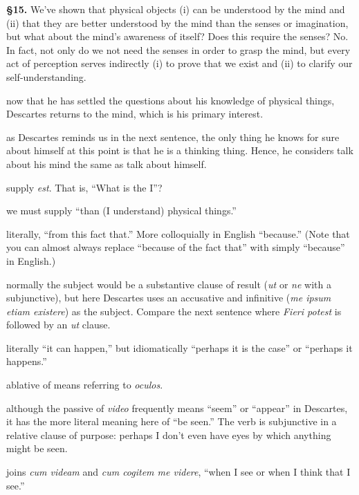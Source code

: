 \prenotes

\textbf{§15.} We've shown that physical objects (i) can be understood by the mind and (ii) that they are better understood by the mind than the senses or imagination, but what about the mind's awareness of itself? Does this require the senses? No. In fact, not only do we not need the senses in order to grasp the mind, but every act of perception serves indirectly (i) to prove that we exist and (ii) to clarify our self-understanding.

 now that he has settled the questions about his knowledge of physical things, Descartes returns to the mind, which is his primary interest.

 as Descartes reminds us in the next sentence, the only thing he knows for sure about himself at this point is that he is a thinking thing. Hence, he considers talk about his mind the same as talk about himself.

 supply \textit{est}. That is, ``What is the I''?

 we must supply ``than (I understand) physical things.''

 literally, ``from this fact that.'' More colloquially in English ``because.'' (Note that you can almost always replace ``because of the fact that'' with simply ``because'' in English.)

 normally the subject would be a substantive clause of result (\textit{ut} or \textit{ne} with a subjunctive), but here Descartes uses an accusative and infinitive (\textit{me ipsum etiam existere}) as the subject. Compare the next sentence where \textit{Fieri potest} is followed by an \textit{ut} clause.

 literally ``it can happen,'' but idiomatically ``perhaps it is the case'' or ``perhaps it happens.''

 ablative of means referring to \textit{oculos}.

 although the passive of \textit{video} frequently means ``seem'' or ``appear'' in Descartes, it has the more literal meaning here of ``be seen.'' The verb is subjunctive in a relative clause of purpose: perhaps I don't even have eyes by which anything might be seen.

 joins \textit{cum videam} and \textit{cum cogitem me videre}, ``when I see or when I think that I see.''

